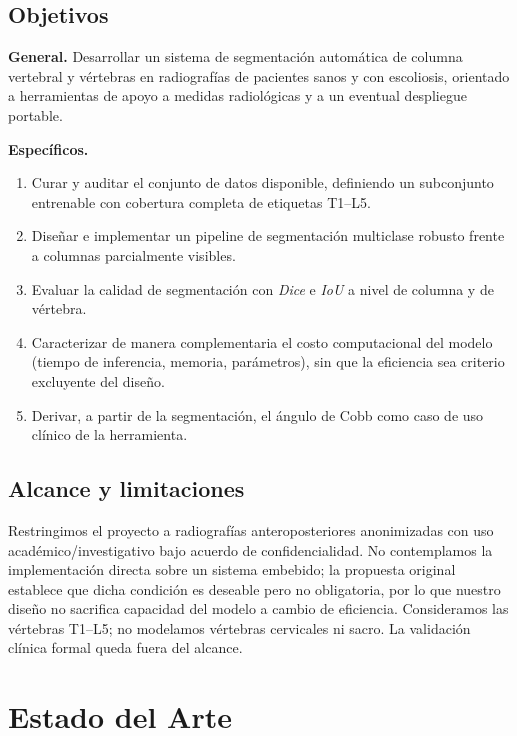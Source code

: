 \documentclass[conference]{IEEEtran}
\begin{document}
\subsection{Objetivos}
\textbf{General.} Desarrollar un sistema de segmentación automática de columna vertebral y vértebras en radiografías de pacientes sanos y con escoliosis, orientado a herramientas de apoyo a medidas radiológicas y a un eventual despliegue portable.

\noindent\textbf{Específicos.}
\begin{enumerate}
  \item Curar y auditar el conjunto de datos disponible, definiendo un subconjunto entrenable con cobertura completa de etiquetas T1--L5.
  \item Diseñar e implementar un pipeline de segmentación multiclase robusto frente a columnas parcialmente visibles.
  \item Evaluar la calidad de segmentación con \emph{Dice} e \emph{IoU} a nivel de columna y de vértebra.
  \item Caracterizar de manera complementaria el costo computacional del modelo (tiempo de inferencia, memoria, parámetros), sin que la eficiencia sea criterio excluyente del diseño.
  \item Derivar, a partir de la segmentación, el ángulo de Cobb como caso de uso clínico de la herramienta.
\end{enumerate}

\subsection{Alcance y limitaciones}
Restringimos el proyecto a radiografías anteroposteriores anonimizadas con uso académico/investigativo bajo acuerdo de confidencialidad. No contemplamos la implementación directa sobre un sistema embebido; la propuesta original establece que dicha condición es deseable pero no obligatoria, por lo que nuestro diseño no sacrifica capacidad del modelo a cambio de eficiencia. Consideramos las vértebras T1--L5; no modelamos vértebras cervicales ni sacro. La validación clínica formal queda fuera del alcance.

\section{Estado del Arte}
\label{sec:estado-arte}
\end{document}
